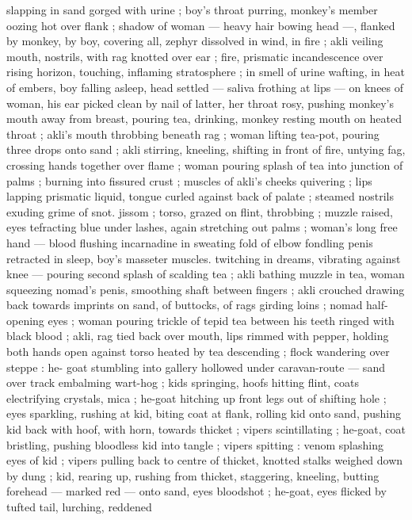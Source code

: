 slapping in sand gorged with urine ; boy's throat purring, monkey's
member oozing hot over flank ; shadow of woman --- heavy hair
bowing head ---, flanked by monkey, by boy, covering all, zephyr
dissolved in wind, in fire ; akli veiling mouth, nostrils, with rag
knotted over ear ; fire, prismatic incandescence over rising horizon,
touching, inflaming stratosphere ; in smell of urine wafting, in heat
of embers, boy falling asleep, head settled --- saliva frothing at lips
--- on knees of woman, his ear picked clean by nail of latter, her
throat rosy, pushing monkey's mouth away from breast, pouring tea,
drinking, monkey resting mouth on heated throat ; akli’s mouth
throbbing beneath rag ; woman lifting tea-pot, pouring three drops
onto sand ; akli stirring, kneeling, shifting in front of fire, untying
fag, crossing hands together over flame ; woman pouring splash of
tea into junction of palms ; burning into fissured crust ; muscles of
akli's cheeks quivering ; lips lapping prismatic liquid, tongue curled
against back of palate ; steamed nostrils exuding grime of snot.
jissom ; torso, grazed on flint, throbbing ; muzzle raised, eyes
tefracting blue under lashes, again stretching out palms ; woman's
long free hand --- blood flushing incarnadine in sweating fold of
elbow fondling penis retracted in sleep, boy’s masseter muscles.
twitching in dreams, vibrating against knee --- pouring second splash
of scalding tea ; akli bathing muzzle in tea, woman squeezing
nomad’s penis, smoothing shaft between fingers ; akli crouched
drawing back towards imprints on sand, of buttocks, of rags girding
loins ; nomad half-opening eyes ; woman pouring trickle of tepid tea
between his teeth ringed with black blood ; akli, rag tied back over
mouth, lips rimmed with pepper, holding both hands open against
torso heated by tea descending ; flock wandering over steppe : he-
goat stumbling into gallery hollowed under caravan-route --- sand
over track embalming wart-hog ; kids springing, hoofs hitting flint,
coats electrifying crystals, mica ; he-goat hitching up front legs out
of shifting hole ; eyes sparkling, rushing at kid, biting coat at flank,
rolling kid onto sand, pushing kid back with hoof, with horn, towards
thicket ; vipers scintillating ; he-goat, coat bristling, pushing
bloodless kid into tangle ; vipers spitting : venom splashing eyes of
kid ; vipers pulling back to centre of thicket, knotted stalks weighed
down by dung ; kid, rearing up, rushing from thicket, staggering,
kneeling, butting forehead --- marked red --- onto sand, eyes
bloodshot ; he-goat, eyes flicked by tufted tail, lurching, reddened
